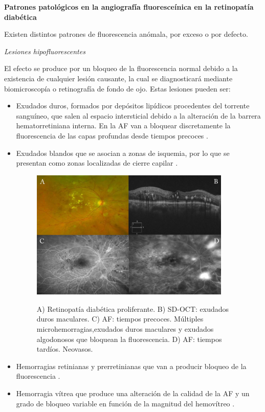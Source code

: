 \textbf{Patrones patológicos en la angiografía fluoresceínica en la retinopatía diabética}

Existen distintos patrones de fluorescencia anómala, por exceso o por defecto.
\\
 
  
\begin{large}
 \textit{Lesiones hipofluorescentes}
\end{large}

El efecto se produce por un bloqueo de la fluorescencia normal debido a la existencia de cualquier lesión causante, la cual se diagnosticará mediante biomicroscopía o retinografía de fondo de ojo. Estas lesiones pueden ser:
\begin{itemize}
\item Exudados duros, formados por depósitos lipídicos procedentes del torrente sanguíneo, que salen al espacio intersticial debido a la alteración de la barrera hematorretiniana interna. En la AF van a bloquear discretamente la fluorescencia de las capas profundas desde tiempos precoces .
\item Exudados blandos que se asocian a zonas de isquemia, por lo que se presentan como zonas localizadas de cierre capilar .

\begin{figure}[H]
\centering
\includegraphics[width=0.9\textwidth]{./Figures/AF_HIPOFLUORECINA.png}
\label{fig:lightfilter}
\caption{ A) Retinopatía diabética proliferante. B) SD-OCT: exudados duros maculares. C) AF: tiempos precoces. Múltiples microhemorragias,exudados duros maculares y exudados algodonosos que bloquean la fluorescencia. D) AF: tiempos tardíos. Neovasos.}
\end{figure}

\item Hemorragias retinianas y prerretinianas que van a producir bloqueo de la fluorescencia .
\item  Hemorragia vítrea que produce una alteración de la calidad de la AF y un grado de bloqueo variable en función de la magnitud del hemovítreo .  
\end{itemize}


